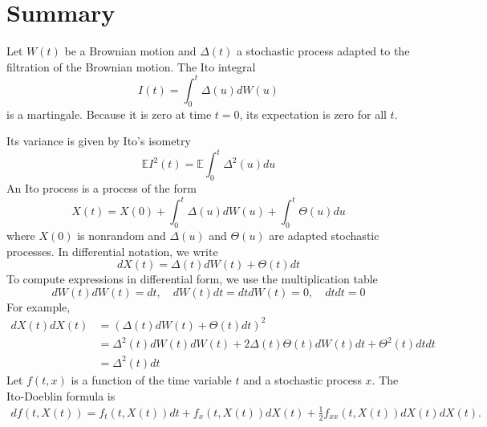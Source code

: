 \documentclass[\topdir/lecture\_notes.tex]{subfiles}
\begin{document}
\section{Summary}
Let $W(t)$ be a Brownian motion and $\Delta(t)$ a stochastic process adapted to the filtration of the Brownian motion. The Ito integral
\begin{equation*}
I(t)=\int_{0}^{t} \Delta(u) d W(u) \label{4.8.1}
\end{equation*}
is a martingale. Because it is zero at time $t=0$, its expectation is zero for all $t$. 

Its variance is given by Ito's isometry
\begin{equation*}
\mathbb{E} I^{2}(t)=\mathbb{E} \int_{0}^{t} \Delta^{2}(u) d u \label{4.8.2}
\end{equation*}
An Ito process is a process of the form
\begin{equation*}
X(t)=X(0)+\int_{0}^{t} \Delta(u) d W(u)+\int_{0}^{t} \Theta(u) d u \label{4.8.4}
\end{equation*}
where $X(0)$ is nonrandom and $\Delta(u)$ and $\Theta(u)$ are adapted stochastic processes. In differential notation, we write
\begin{equation*}
d X(t)=\Delta(t) d W(t)+\Theta(t) d t
\end{equation*}
To compute expressions in differential form, we use the multiplication table
\begin{equation*}
d W(t) d W(t)=d t, \quad d W(t) d t=d t d W(t)=0, \quad d t d t=0
\end{equation*}
For example,
\begin{align*}
dX(t) dX(t) & =(\Delta(t) dW(t)+\Theta(t) dt)^{2} \\
& =\Delta^{2}(t) dW(t) dW(t)+2 \Delta(t) \Theta(t) dW(t) dt+\Theta^{2}(t) dt dt \\
& =\Delta^{2}(t) dt
\end{align*}
Let $f(t, x)$ is a function of the time variable $t$ and a stochastic process $x$. The Ito-Doeblin formula is
\begin{align*}
    df(t, X(t))=f_{t}(t, X(t)) d t+f_{x}(t, X(t)) d X(t)+\frac{1}{2} f_{x x}(t, X(t)) dX(t) dX(t).
\end{align*}
\end{document}
